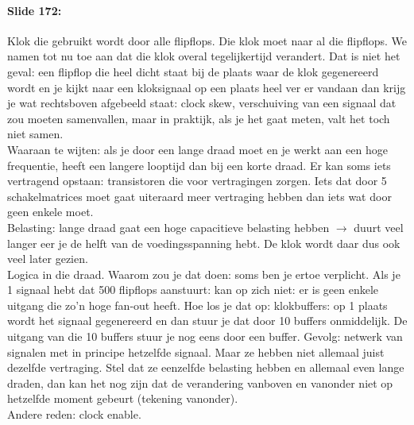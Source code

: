 \documentclass[10pt,a4paper]{book}
\begin{document}
\paragraph{Slide 172:} Klok die gebruikt wordt door alle flipflops. Die klok moet naar al die flipflops. We namen tot nu toe aan dat die klok overal tegelijkertijd verandert. Dat is niet het geval: een flipflop die heel dicht staat bij de plaats waar de klok gegenereerd wordt en je kijkt naar een kloksignaal op een plaats heel ver er vandaan dan krijg je wat rechtsboven afgebeeld staat: clock skew, verschuiving van een signaal dat zou moeten samenvallen, maar in praktijk, als je het gaat meten, valt het toch niet samen.\\
Waaraan te wijten: als je door een lange draad moet en je werkt aan een hoge frequentie, heeft een langere looptijd dan bij een korte draad. Er kan soms iets vertragend opstaan: transistoren die voor vertragingen zorgen. Iets dat door 5 schakelmatrices moet gaat uiteraard meer vertraging hebben dan iets wat door geen enkele moet.\\
Belasting: lange draad gaat een hoge capacitieve belasting hebben $\rightarrow$ duurt veel langer eer je de helft van de voedingsspanning hebt. De klok wordt daar dus ook veel later gezien.\\
Logica in die draad. Waarom zou je dat doen: soms ben je ertoe verplicht. Als je 1 signaal hebt dat 500 flipflops aanstuurt: kan op zich niet: er is geen enkele uitgang die zo'n hoge fan-out heeft. Hoe los je dat op: klokbuffers: op 1 plaats wordt het signaal gegenereerd en dan stuur je dat door 10 buffers onmiddelijk. De uitgang van die 10 buffers stuur je nog eens door een buffer. Gevolg: netwerk van signalen met in principe hetzelfde signaal. Maar ze hebben niet allemaal juist dezelfde vertraging. Stel dat ze eenzelfde belasting hebben en allemaal even lange draden, dan kan het nog zijn dat de verandering vanboven en vanonder niet op hetzelfde moment gebeurt (tekening vanonder).\\
Andere reden: clock enable.
\end{document}
